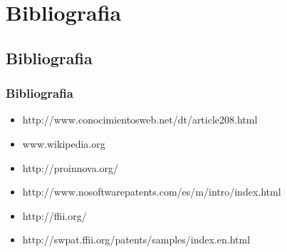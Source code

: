 \section{Bibliografia}
\subsection{Bibliografia}
\frame
{
	\frametitle{Bibliografia}
	\begin{itemize}
	\item http://www.conocimientosweb.net/dt/article208.html
	\item www.wikipedia.org

	\item http://proinnova.org/
	\item http://www.nosoftwarepatents.com/es/m/intro/index.html
	\item http://ffii.org/
	\item http://swpat.ffii.org/patents/samples/index.en.html
	\end{itemize}
}
